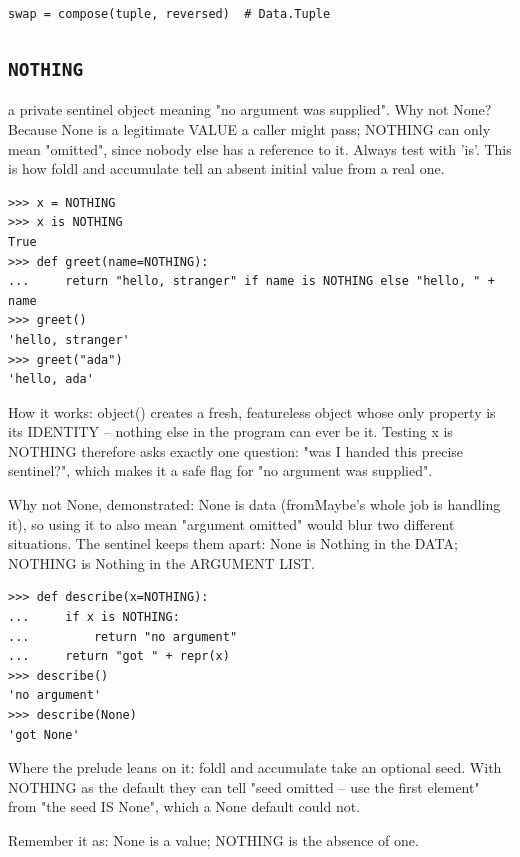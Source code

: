\documentclass[10pt,letterpaper]{book}
\begin{document}
\begin{lstlisting}[style=ex]
swap = compose(tuple, reversed)  # Data.Tuple
\end{lstlisting}

\subsection{\texttt{NOTHING}}\label{def:NOTHING}
a private sentinel object meaning "no argument was supplied". Why not None? Because None is a legitimate VALUE a caller might pass; NOTHING can only mean "omitted", since nobody else has a reference to it. Always test with 'is'. This is how foldl and accumulate tell an absent initial value from a real one.
\begin{lstlisting}[style=ex]
>>> x = NOTHING
>>> x is NOTHING
True
>>> def greet(name=NOTHING):
...     return "hello, stranger" if name is NOTHING else "hello, " + name
>>> greet()
'hello, stranger'
>>> greet("ada")
'hello, ada'
\end{lstlisting}

How it works: object() creates a fresh, featureless object whose only property is its IDENTITY -- nothing else in the program can ever be it. Testing x is NOTHING therefore asks exactly one question: "was I handed this precise sentinel?", which makes it a safe flag for "no argument was supplied".


Why not None, demonstrated: None is data (fromMaybe's whole job is handling it), so using it to also mean "argument omitted" would blur two different situations. The sentinel keeps them apart: None is Nothing in the DATA; NOTHING is Nothing in the ARGUMENT LIST.

\begin{lstlisting}[style=ex]
>>> def describe(x=NOTHING):
...     if x is NOTHING:
...         return "no argument"
...     return "got " + repr(x)
>>> describe()
'no argument'
>>> describe(None)
'got None'
\end{lstlisting}

Where the prelude leans on it: foldl and accumulate take an optional seed. With NOTHING as the default they can tell "seed omitted -- use the first element" from "the seed IS None", which a None default could not.


Remember it as: None is a value; NOTHING is the absence of one.
\end{document}
